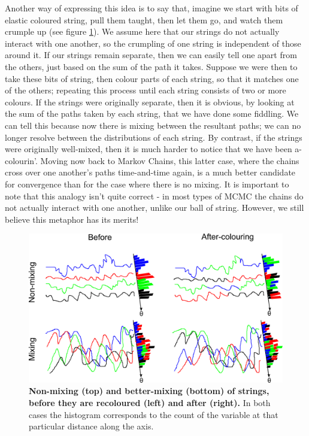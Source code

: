 \documentclass[11pt,fullpage]{book}
\begin{document}
Another way of expressing this idea is to say that, imagine we start with bits of elastic coloured string, pull them taught, then let them go, and watch them crumple up (see figure \ref{fig:metropolisHastings_chainMixing}). We assume here that our strings do not actually interact with one another, so the crumpling of one string is independent of those around it. If our strings remain separate, then we can easily tell one apart from the others, just based on the sum of the path it takes. Suppose we were then to take these bits of string, then colour parts of each string, so that it matches one of the others; repeating this process until each string consists of two or more colours. If the strings were originally separate, then it is obvious, by looking at the sum of the paths taken by each string, that we have done some fiddling. We can tell this because now there is mixing between the resultant paths; we can no longer resolve between the distributions of each string. By contrast, if the strings were originally well-mixed, then it is much harder to notice that we have been a-colourin'. Moving now back to Markov Chains, this latter case, where the chains cross over one another's paths time-and-time again, is a much better candidate for convergence than for the case where there is no mixing. It is important to note that this analogy isn't quite correct - in most types of MCMC the chains do not actually interact with one another, unlike our ball of string. However, we still believe this metaphor has its merits!

\begin{figure}
\centerline{\includegraphics[width=1\textwidth]{metropolisHastings_chainMixing.pdf}}
\caption{\textbf{Non-mixing (top) and better-mixing (bottom) of strings, before they are recoloured (left) and after (right).} In both cases the histogram corresponds to the count of the variable at that particular distance along the axis.}\label{fig:metropolisHastings_chainMixing}
\end{figure}
\end{document}
